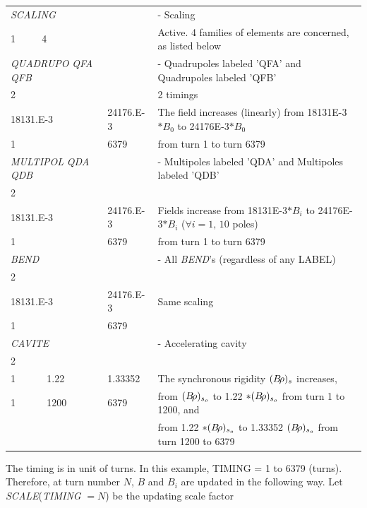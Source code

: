 {\renewcommand{\arraystretch}{1}
\noindent\begin{tabular}{lll}
  \textsl{SCALING}    &          & - Scaling \\
  1    ~~~~ 4         &          &  Active. 4 families of elements are concerned, as listed below \\
  \textsl{QUADRUPO} \textsl{QFA} \textsl{QFB}&          & - Quadrupoles labeled 'QFA' and Quadrupoles labeled 'QFB' \\
  2                   &          & 2 timings  \\
  18131.E-3           & 24176.E-3 \qquad 
                                 &   The field increases (linearly) from 18131E-3$\ast B_0 $ 
                                 to 24176E-3$\ast B_0 $  \\
  1                   & 6379     &  from turn 1 to turn 6379\\
  \textsl{MULTIPOL} \textsl{QDA} \textsl{QDB}&          &- Multipoles labeled 'QDA' and Multipoles labeled 'QDB'\\
  2   \\                      
  18131.E-3           &24176.E-3 &  Fields  increase from 18131E-3$\ast {B_i} $ to 
                                  24176E-3$\ast  {B_i} $  ($\forall i=1,\,10$ poles) \\
  1                   & 6379     & from turn 1 to turn 6379\\
  \textsl{BEND}       &          &- All \textsl{BEND}'s (regardless of any LABEL) \\
  2    \\
  18131.E-3           &24176.E-3 &  Same scaling \\
  1                   & 6379  \\
  \textsl{CAVITE}     &          &- Accelerating cavity \\
  2  \\
  1 ~~~~~ 1.22        &1.33352   &The synchronous rigidity $(B\!\rho )_s $ increases, \\
  1 ~~~~~   1200      & 6379     &from $ (B\!\rho )_{s_o} $ to 1.22 $\ast (B\!\rho)_{s_o} $ from turn 1 to 1200, and \\
                      &          &from 1.22 $\ast (B\!\rho)_{s_o} $ to 1.33352 $ (B\!\rho )_{s_o} $ from turn 1200 to 6379 
\end{tabular} }                   
 \bigskip

\noindent The timing is in unit of turns. In this example, TIMING = 1 to 6379 
(turns). Therefore, at turn number $ N$, $B $ and $ B_i $ are updated in the 
following way. Let \textsl{SCALE}(\textsl{TIMING} $ = N$) be the updating scale factor

